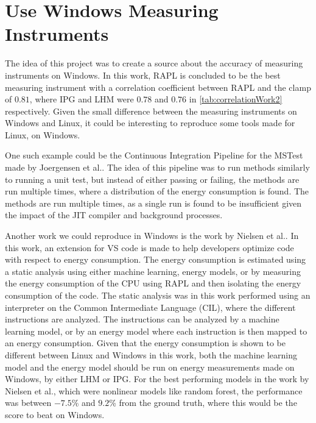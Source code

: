 \section{Use Windows Measuring Instruments}

The idea of this project was to create a source about the accuracy of measuring instruments on Windows. In this work, RAPL is concluded to be the best measuring instrument with a correlation coefficient between RAPL and the clamp of $0.81$, where IPG and LHM were $0.78$ and $0.76$ in \cref{tab:correlationWork2} respectively. Given the small difference between the measuring instruments on Windows and Linux, it could be interesting to reproduce some tools made for Linux, on Windows.\newline

One such example could be the Continuous Integration Pipeline for the MSTest made by Joergensen et al.\cite{Joergensen2022}. The idea of this pipeline was to run methods similarly to running a unit test, but instead of either passing or failing, the methods are run multiple times, where a distribution of the energy consumption is found. The methods are run multiple times, as a single run is found to be insufficient given the impact of the JIT compiler and background processes.\newline

Another work we could reproduce in Windows is the work by Nielsen et al.\cite{Nielsen2021}. In this work, an extension for VS code is made to help developers optimize code with respect to energy consumption. The energy consumption is estimated using a static analysis using either machine learning, energy models, or by measuring the energy consumption of the CPU using RAPL and then isolating the energy consumption of the code. The static analysis was in this work performed using an interpreter on the Common Intermediate Language (CIL), where the different instructions are analyzed. The instructions can be analyzed by a machine learning model, or by an energy model where each instruction is then mapped to an energy consumption. Given that the energy consumption is shown to be different between Linux and Windows in this work, both the machine learning model and the energy model should be run on energy measurements made on Windows, by either LHM or IPG. For the best performing models in the work by Nielsen et al.\cite{Nielsen2021}, which were nonlinear models like random forest, the performance was between $-7.5$\% and $9.2$\% from the ground truth, where this would be the score to beat on Windows.



